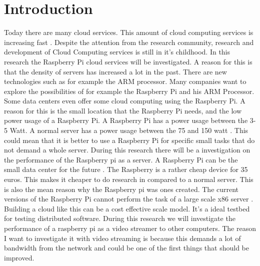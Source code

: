 \documentclass{sig-alternate-br}
\begin{document}

\section{Introduction}
Today there are many cloud services. This amount of cloud computing services is increasing fast \cite{armbrust:2009}.  Despite the attention
from the research community, research and development of Cloud Computing services is still in it's childhood\cite{tso:2013}. 
In this research the Raspberry Pi cloud services will be investigated. A reason for this is that the density of servers has increased a lot in the past\cite{density}. There are new technologies such as for example the ARM processor. Many companies want to explore the possibilities of for example the Raspberry Pi and his ARM Processor. Some data centers even offer some cloud computing using the Raspberry Pi. A reason for this is the small location that the Raspberry Pi needs, and the low power usage of a Raspberry Pi\cite{hosting,Pcextreme}.  A Raspberry Pi has a power usage between the 3-5 Watt. A normal server has a power usage between the 75 and 150 watt \cite{Powerusage}. This could mean that it is better to use a Raspberry Pi for specific small tasks that do not demand a whole server. During this research there will be a investigation on the performance of the Raspberry pi as a server.  A Raspberry Pi can be the small data center for the future \cite{tso:2013}. The Raspberry is a rather cheap device for 35 euros. This makes it cheaper to do research in compared to a normal server. This is also the mean reason why the Raspberry pi was ones created. The current versions of the Raspberry Pi cannot perform the task of a large scale x86 server \cite{tso:2013}. Building a cloud like this can be a cost effective scale model\cite{tso:2013}. It's a ideal testbed for testing distributed software. During this research we will investigate the performance of a raspberry pi as a video streamer to other computers. The reason I want to investigate it with video streaming is because this demands a lot of bandwidth from the network and could be one of the first things that should be improved. 
\end{document}

